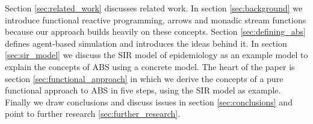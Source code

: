 Section \ref{sec:related_work} discusses related work. In section \ref{sec:background} we introduce functional reactive programming, arrows and monadic stream functions because our approach builds heavily on these concepts. Section \ref{sec:defining_abs} defines agent-based simulation and introduces the ideas behind it. In section \ref{sec:sir_model} we discuss the SIR model of epidemiology as an example model to explain the concepts of ABS using a concrete model. The heart of the paper is section \ref{sec:functional_approach} in which we derive the concepts of a pure functional approach to ABS in five steps, using the SIR model as example. Finally we draw conclusions and discuss issues in section \ref{sec:conclusions} and point to further research \ref{sec:further_research}.


